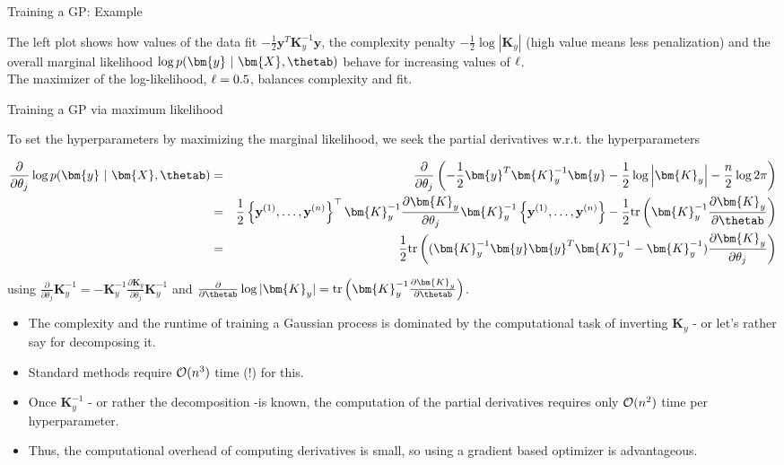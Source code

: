 \begin{vbframe}{Training a GP: Example}
\begin{footnotesize}
	The left plot shows how values of the data fit $-\frac{1}{2}\bm{y}^T\bm{K}_y^{-1} \bm{y}$, the complexity penalty $- \frac{1}{2} \log \left| \bm{K}_y \right|$ (high value means less penalization) and the overall marginal likelihood $\log p(\bm{y} ~|~ \bm{X}, \thetab)$ behave for increasing values of $\ell$.\\ 
	The maximizer of the log-likelihood, $\ell = 0.5$, balances complexity and fit. 
\end{footnotesize}


\end{vbframe}

\begin{vbframe}{Training a GP via maximum likelihood}

To set the hyperparameters by maximizing the marginal likelihood, we seek the partial derivatives w.r.t. the hyperparameters

\begin{footnotesize}
\begin{eqnarray*}
\frac{\partial}{\partial\theta_j} \log p(\bm{y} ~|~ \bm{X}, \thetab) &=& \frac{\partial}{\partial\theta_j}  \left(-\frac{1}{2}\bm{y}^T\bm{K}_y^{-1} \bm{y} - \frac{1}{2} \log \left| \bm{K}_y \right| - \frac{n}{2} \log 2\pi\right) \\ 
&=&\frac{1}{2} \ydat^\top \bm{K}_y^{-1} \frac{\partial \bm{K}_y}{\partial \theta_j}\bm{K}_y^{-1} \ydat - \frac{1}{2} \text{tr}\left(\bm{K}_y^{-1} \frac{\partial \bm{K}_y}{\partial \thetab} \right) \\
&=& \frac{1}{2} \text{tr}\left((\bm{K}_y^{-1}\bm{y}\bm{y}^T\bm{K}_y^{-1} - \bm{K}_y^{-1})\frac{\partial\bm{K}_y}{\partial\theta_j}\right)
\end{eqnarray*}
\end{footnotesize}

using $\frac{\partial}{\partial \theta_j} \bm{K}_y^{-1} = - \bm{K}_y^{-1} \frac{\partial \bm{K}_y}{\partial \theta_j}\bm{K}_y^{-1}$ and $\frac{\partial}{\partial \thetab} \log  |\bm{K}_y| = \text{tr}\left(\bm{K}_y^{-1} \frac{\partial \bm{K}_y}{\partial \thetab} \right)$. 

\framebreak

\begin{itemize}
  \item The complexity and the runtime of training a Gaussian process is dominated by the computational task of inverting $\bm{K}_y$ - or let's rather say for decomposing it.
  \item Standard methods require $\mathcal{O}(n^3)$ time (!) for this.
  \item Once $\bm{K}_y^{-1}$ - or rather the decomposition -is known, the computation of the partial derivatives requires only $\mathcal{O}(n^2)$ time per hyperparameter.
  \item  Thus, the computational overhead of computing derivatives is small, so using a gradient based optimizer is advantageous. 
\end{itemize} 



\end{vbframe}
